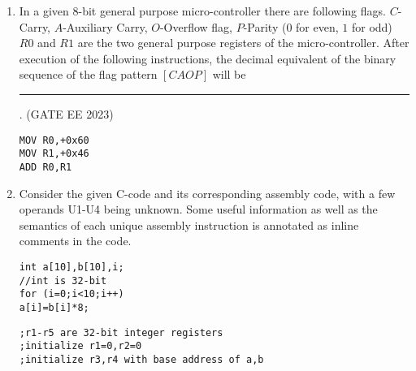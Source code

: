 \begin{enumerate}[label=\arabic*.,ref=\theenumi]
\item In a given $8$-bit general purpose micro-controller there are following flags. $C$-Carry, $A$-Auxiliary Carry, $O$-Overflow flag, $P$-Parity ($0$ for even, $1$ for odd) $R0$ and $R1$ are the two general purpose registers of the micro-controller. After execution of the following instructions, the decimal equivalent of the binary sequence of the flag pattern $[CAOP]$ will be \rule{1cm}{0.1pt}.
\hfill{(GATE EE 2023)}
\begin{lstlisting}
MOV R0,+0x60
MOV R1,+0x46 
ADD R0,R1
\end{lstlisting}
\item 
Consider the given C-code and its corresponding assembly code, with a few operands U1-U4 being unknown. Some useful information as well as the semantics of each unique assembly instruction is annotated as inline comments in the code.
\begin{lstlisting}
int a[10],b[10],i;
//int is 32-bit
for (i=0;i<10;i++)
a[i]=b[i]*8;
\end{lstlisting}
%
\begin{lstlisting}
;r1-r5 are 32-bit integer registers
;initialize r1=0,r2=0
;initialize r3,r4 with base address of a,b


\end{lstlisting}
\end{enumerate}
